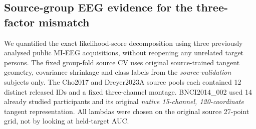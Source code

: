 \subsection{Source-group EEG evidence for the three-factor mismatch}
\label{sec:bspc-source-three-acq}
We quantified the exact likelihood-score decomposition
using three previously analysed public MI-EEG acquisitions,
without reopening any unrelated target persons.
The fixed group-fold source CV uses original source-trained
tangent geometry, covariance shrinkage and class labels
from the \emph{source-validation} subjects only.
The Cho2017 and Dreyer2023A source pools each contained
12 distinct released IDs and a fixed three-channel
montage. BNCI2014\_002 used 14 already studied
participants and its original \emph{native 15-channel,
120-coordinate} tangent representation.
All lambdas were chosen on the original source
27-point grid, not by looking at held-target AUC.

